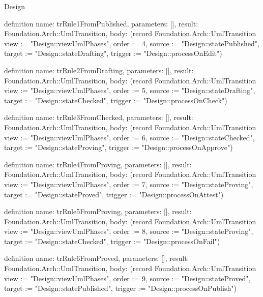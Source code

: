 \begin{lexlean}{Design}
\begin{semanticmodule}
definition{
  name: trRule1FromPublished,
  parameters: [],
  result: Foundation.Arch::UmlTransition,
  body: (record Foundation.Arch::UmlTransition {view := "Design::viewUmlPhases", order := 4, source := "Design::statePublished", target := "Design::stateDrafting", trigger := "Design::processOnEdit"})
}

definition{
  name: trRule2FromDrafting,
  parameters: [],
  result: Foundation.Arch::UmlTransition,
  body: (record Foundation.Arch::UmlTransition {view := "Design::viewUmlPhases", order := 5, source := "Design::stateDrafting", target := "Design::stateChecked", trigger := "Design::processOnCheck"})
}

definition{
  name: trRule3FromChecked,
  parameters: [],
  result: Foundation.Arch::UmlTransition,
  body: (record Foundation.Arch::UmlTransition {view := "Design::viewUmlPhases", order := 6, source := "Design::stateChecked", target := "Design::stateProving", trigger := "Design::processOnApprove"})
}

definition{
  name: trRule4FromProving,
  parameters: [],
  result: Foundation.Arch::UmlTransition,
  body: (record Foundation.Arch::UmlTransition {view := "Design::viewUmlPhases", order := 7, source := "Design::stateProving", target := "Design::stateProved", trigger := "Design::processOnAttest"})
}

definition{
  name: trRule5FromProving,
  parameters: [],
  result: Foundation.Arch::UmlTransition,
  body: (record Foundation.Arch::UmlTransition {view := "Design::viewUmlPhases", order := 8, source := "Design::stateProving", target := "Design::stateChecked", trigger := "Design::processOnFail"})
}

definition{
  name: trRule6FromProved,
  parameters: [],
  result: Foundation.Arch::UmlTransition,
  body: (record Foundation.Arch::UmlTransition {view := "Design::viewUmlPhases", order := 9, source := "Design::stateProved", target := "Design::statePublished", trigger := "Design::processOnPublish"})
}
\end{semanticmodule}
\end{lexlean}
